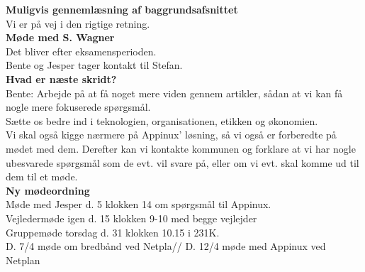 \textbf{Muligvis gennemlæsning af baggrundsafsnittet} 
\\
Vi er på vej i den rigtige retning. \\

\textbf{Møde med S. Wagner} 
\\
Det bliver efter eksamensperioden. \\
Bente og Jesper tager kontakt til Stefan.\\

\textbf{Hvad er næste skridt?} 
\\
Bente: Arbejde på at få noget mere viden gennem artikler, sådan at vi kan få nogle mere fokuserede spørgsmål.\\
Sætte os bedre ind i teknologien, organisationen, etikken og økonomien.\\
Vi skal også kigge nærmere på Appinux' løsning, så vi også er forberedte på mødet med dem. 
Derefter kan vi kontakte kommunen og forklare at vi har nogle ubesvarede spørgsmål som de evt. vil svare på, eller om vi evt. skal komme ud til dem til et møde. \\

\textbf{Ny mødeordning} 
\\
Møde med Jesper d. 5 klokken 14 om spørgsmål til Appinux.\\
Vejledermøde igen d. 15 klokken 9-10 med begge vejlejder\\

Gruppemøde torsdag d. 31 klokken 10.15 i 231K. \\

D. 7/4 møde om bredbånd ved Netpla// 
D. 12/4 møde med Appinux ved Netplan 

